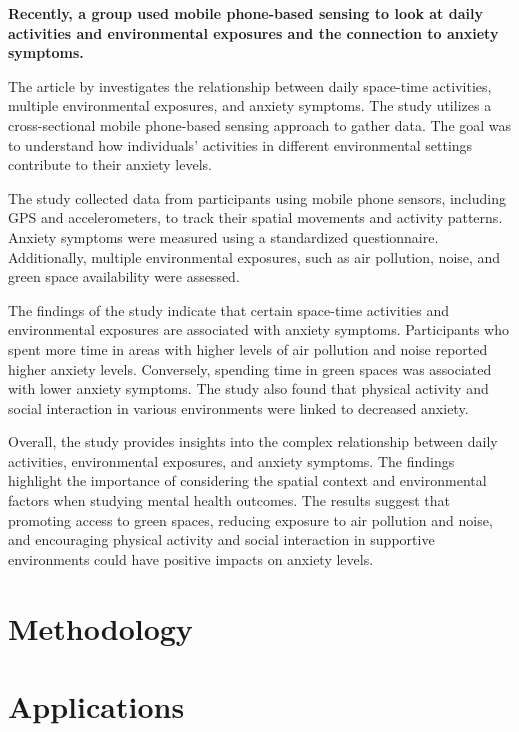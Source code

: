 \documentclass[
  letterpaper,
  authoryear]{elsarticle}
\begin{document}
\textbf{Recently, a group used mobile phone-based sensing to look at
daily activities and environmental exposures and the connection to
anxiety symptoms.}

The article by \citet{lan2022} investigates the relationship between
daily space-time activities, multiple environmental exposures, and
anxiety symptoms. The study utilizes a cross-sectional mobile
phone-based sensing approach to gather data. The goal was to understand
how individuals' activities in different environmental settings
contribute to their anxiety levels.

The study collected data from participants using mobile phone sensors,
including GPS and accelerometers, to track their spatial movements and
activity patterns. Anxiety symptoms were measured using a standardized
questionnaire. Additionally, multiple environmental exposures, such as
air pollution, noise, and green space availability were assessed.

The findings of the study indicate that certain space-time activities
and environmental exposures are associated with anxiety symptoms.
Participants who spent more time in areas with higher levels of air
pollution and noise reported higher anxiety levels. Conversely, spending
time in green spaces was associated with lower anxiety symptoms. The
study also found that physical activity and social interaction in
various environments were linked to decreased anxiety.

Overall, the study provides insights into the complex relationship
between daily activities, environmental exposures, and anxiety symptoms.
The findings highlight the importance of considering the spatial context
and environmental factors when studying mental health outcomes. The
results suggest that promoting access to green spaces, reducing exposure
to air pollution and noise, and encouraging physical activity and social
interaction in supportive environments could have positive impacts on
anxiety levels.


\hypertarget{methodology}{%
\section{Methodology}\label{methodology}}


\hypertarget{applications}{%
\section{Applications}\label{applications}}
\end{document}
